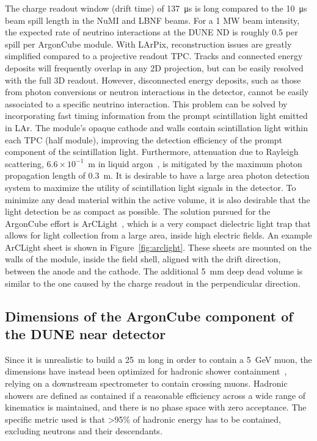 The charge readout window (drift time) of \SI{137}{\micro\second} is long compared to the \SI{10}{\micro\second}~\cite{numi} beam spill length in the NuMI and LBNF beams.
For a 1 MW beam intensity, the expected rate of neutrino interactions at the DUNE ND is roughly 0.5 per spill per ArgonCube module.  
With LArPix, reconstruction issues are greatly simplified compared to a projective readout TPC.
Tracks and connected energy deposits will frequently overlap in any 2D projection, but can be easily resolved with the full 3D readout.
However, disconnected energy deposits, such as those from photon conversions or neutron interactions in the detector, cannot be easily associated to a specific neutrino interaction.
This problem can be solved by incorporating fast timing information from the prompt scintillation light emitted in LAr.
The module's opaque cathode and walls contain scintillation light within each TPC (half module), improving the detection efficiency of the prompt component of the scintillation light. 
Furthermore, attenuation due to Rayleigh scattering, $6.6\times10^{-1}$~m in liquid argon~\cite{Grace:2015yta}, is mitigated by the maximum photon propagation length of \SI{0.3}{\metre}. 
It is desirable to have a large area photon detection system to maximize the utility of scintillation light signals in the detector. 
To minimize any dead material within the active volume, it is also desirable that the light detection be as compact as possible. 
The solution pursued for the ArgonCube effort is ArCLight~\cite{Auger:2017flc}, which is a very compact dielectric light trap that allows for light collection from a large area, inside high electric fields. 
An example ArCLight sheet is shown in Figure~\ref{fig:arclight}. These sheets are mounted on the walls of the module, inside the field shell, aligned with the drift direction, between the anode and the cathode. 
The additional \SI{5}{\milli\metre} deep dead volume is similar to the one caused by the charge readout in the perpendicular direction.

\subsection{Dimensions of the ArgonCube component of the DUNE near detector}\label{sec:had_containment}

Since it is unrealistic to build a \SI{25}{\metre} long  in order to contain a \SI{5}{\giga\electronvolt} muon, the  dimensions have instead been optimized for hadronic shower containment~\cite{lartpcSizeChris}, relying on a downstream spectrometer to contain crossing muons.
Hadronic showers are defined as contained if a reasonable efficiency across a wide range of kinematics is maintained, and there is no phase space with zero acceptance. 
The specific metric used is that \textgreater95\% of hadronic energy has to be contained, excluding neutrons and their descendants.

